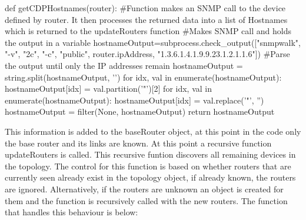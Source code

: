 \documentclass[11pt]{report}
\begin{document}
\begin{python}
	def getCDPHostnames(router):
	#Function makes an SNMP call to the device defined by router. It then processes the returned data into a list of Hostnames which is returned to the updateRouters function
	#Makes SNMP call and holds the output in a variable
	hostnameOutput=subprocess.check_output(["snmpwalk", "-v", "2c", "-c", "public", router.ipAddress, "1.3.6.1.4.1.9.9.23.1.2.1.1.6"])
	#Parse the output until only the IP addresses remain
	hostnameOutput = string.split(hostnameOutput, '\n')
	for idx, val in enumerate(hostnameOutput):
		hostnameOutput[idx] = val.partition('"')[2]
	for idx, val in enumerate(hostnameOutput):
		hostnameOutput[idx] = val.replace('"', '')
	hostnameOutput = filter(None, hostnameOutput)
	return hostnameOutput
\end{python}

This information is added to the baseRouter object, at this point in the code only the base router and its links are known. At this point a recursive function updateRouters is called. This recursive funtion discovers all remaining devices in the topology. The control for this function is based on whether routers that are currently seen already exist in the topology object, if already known, the routers are ignored. Alternatively, if the routers are unknown an object is created for them and the function is recursively called with the new routers. The function that handles this behaviour is below:
\end{document}
